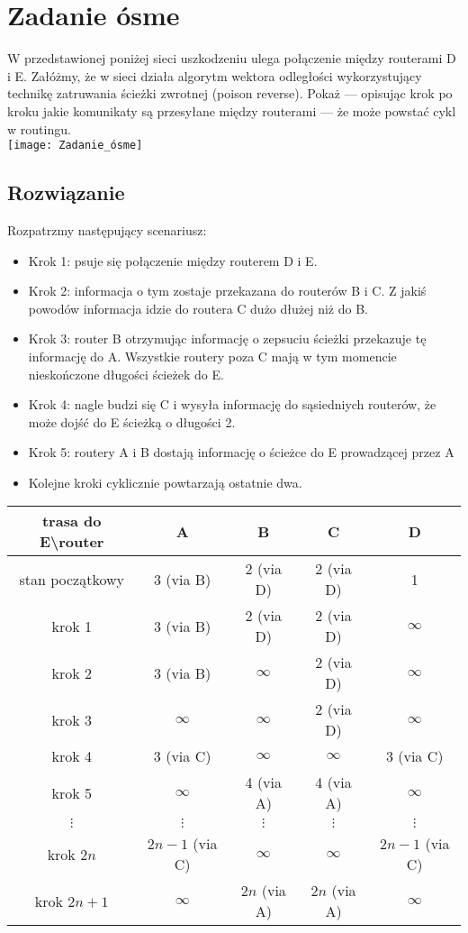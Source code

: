 \documentclass[a4paper]{article}
\begin{document}
\section{Zadanie ósme}
W przedstawionej poniżej sieci uszkodzeniu ulega połączenie między routerami D i E. Załóżmy, że w sieci działa algorytm wektora odległości wykorzystujący technikę zatruwania ścieżki zwrotnej (poison reverse). Pokaż — opisując krok po kroku jakie komunikaty są przesyłane między routerami — że może powstać cykl w routingu.\\
\texttt{[image: Zadanie\_ósme]}

\subsection{Rozwiązanie}
Rozpatrzmy następujący scenariusz: 
\begin{itemize}
\item Krok 1: psuje się połączenie między routerem D i E.
\item Krok 2: informacja o tym zostaje przekazana do routerów B i C. Z jakiś powodów informacja idzie do routera C dużo dłużej niż do B.
\item Krok 3: router B otrzymując informację o zepsuciu ścieżki przekazuje tę informację do A. Wszystkie routery poza C mają w tym momencie nieskończone długości ścieżek do E.
\item Krok 4: nagle budzi się C i wysyła informację do sąsiedniych routerów, że może dojść do E ścieżką o długości 2.
\item Krok 5: routery A i B dostają informację o ścieżce do E prowadzącej przez A
\item Kolejne kroki cyklicznie powtarzają ostatnie dwa.
\end{itemize}

\begin{center}
\begin{tabular}{ |c|c|c|c|c| } 
 \hline
 \textbf{trasa do E\textbackslash router} & \textbf{A} & \textbf{B} & \textbf{C} & \textbf{D} \\ 
 \hline
 stan początkowy & 3 (via B) & 2 (via D) & 2 (via D) & 1 \\ 
 \hline
 krok 1 & 3 (via B) & 2 (via D) & 2 (via D) & $\infty$ \\ 
 \hline
 krok 2 & 3 (via B) & $\infty$ & 2 (via D) & $\infty$ \\ 
 \hline
 krok 3 & $\infty$ & $\infty$ & 2 (via D) & $\infty$ \\ 
 \hline
 krok 4 & 3 (via C) & $\infty$ & $\infty$ & 3 (via C) \\ 
 \hline
 krok 5 & $\infty$ & 4 (via A) & 4 (via A) & $\infty$ \\ 
 \hline
 $\vdots$ & $\vdots$ & $\vdots$ & $\vdots$ & $\vdots$ \\ 
 \hline
 krok $2n$ & $2n - 1$ (via C) & $\infty$ & $\infty$ & $2n - 1$ (via C) \\ 
 \hline
 krok $2n + 1$ & $\infty$ & $2n$ (via A) & $2n$ (via A) & $\infty$ \\ 
 \hline
\end{tabular}
\end{center}


\end{document}
